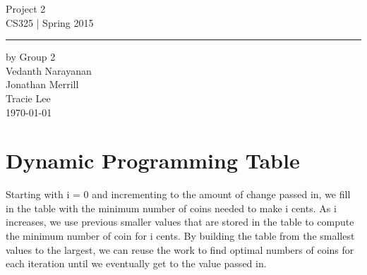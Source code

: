 \documentclass[11pt,letterpaper]{article}
\begin{document}
\begin{titlepage}
    \vspace*{4cm}
    \begin{flushright}
    {\huge
        Project 2\\[5mm]
    }
    {\large
        CS325 | Spring 2015
     }
    \end{flushright}
\hrule
    \begin{flushright}
	by Group 2\\
	Vedanth Narayanan\\
	Jonathan Merrill\\
	Tracie Lee\\
    \vfill
	\today\\
    \end{flushright}
\end{titlepage}

\raggedright

\section{Dynamic Programming Table}
Starting with i = 0 and incrementing to the amount of change passed in, we fill in the table with the minimum number of coins needed to make i cents. As i increases, we use previous smaller values that are stored in the table to compute the minimum number of coin for i cents. By building the table from the smallest values to the largest, we can reuse the work to find optimal numbers of coins for each iteration until we eventually get to the value passed in. 
\end{document}
